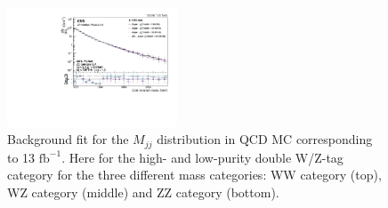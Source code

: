 \begin{figure}[htb]
\includegraphics[width=0.45\textwidth]{figures/analysis/search2/AN-16-235/plots/ZZLP_fitComp.pdf}
\caption{Background fit for the $M_{jj}$ distribution in QCD MC corresponding to 13 $\textrm{fb}^{-1}$. Here for the high- and low-purity double W/Z-tag category for the three different mass categories: WW category (top), WZ category (middle) and ZZ category (bottom).}
\label{fig:bkgfitQCD_VV}
\end{figure}

